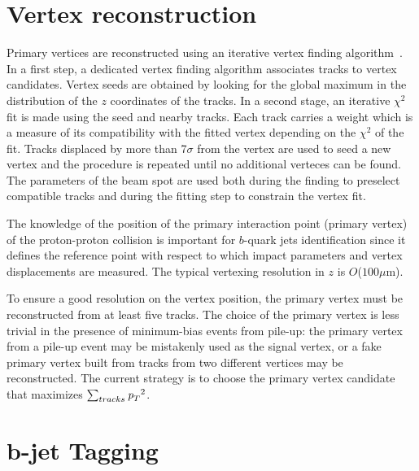 \section{Vertex reconstruction}\label{sec:trackreco}

Primary vertices are reconstructed using an iterative vertex finding algorithm~\cite{ATLAS-CONF-2010-069}. In a first step, a dedicated vertex finding algorithm associates tracks to vertex candidates. Vertex seeds are obtained by looking for the global maximum in the distribution of the $z$ coordinates of the tracks. In a second stage, an iterative $\chi^2$ fit is made using the seed and nearby tracks. Each track carries a weight which is a measure of its compatibility with the fitted vertex depending on the $\chi^2$ of the fit. Tracks displaced by more than 7$\sigma$ from the vertex are used to seed a new vertex and the procedure is repeated until no additional verteces can be found.  %
The parameters of the beam spot are used both during the finding to preselect compatible tracks and during the fitting step to constrain the vertex fit.


The knowledge of the position of the primary interaction point (primary vertex) of the proton-proton collision is important for $b$-quark jets identification since it defines the reference point with respect to which impact parameters and vertex displacements are measured.  The typical vertexing resolution in $z$ is $O$($100 \mu$m).


To ensure a good resolution on the vertex position, the primary vertex
must be reconstructed from at least five tracks. The choice of the primary vertex is less trivial in the presence of minimum-bias events from pile-up:
the primary vertex from a pile-up event may be mistakenly used as the signal vertex, or a fake primary vertex built from tracks from two different vertices may be reconstructed. The current strategy is to choose the primary vertex candidate that maximizes $\sum_{tracks} {\emph{p}_{T}}^2$.

\section{ ${\bm b}$-jet Tagging}\label{sec:btagging}

